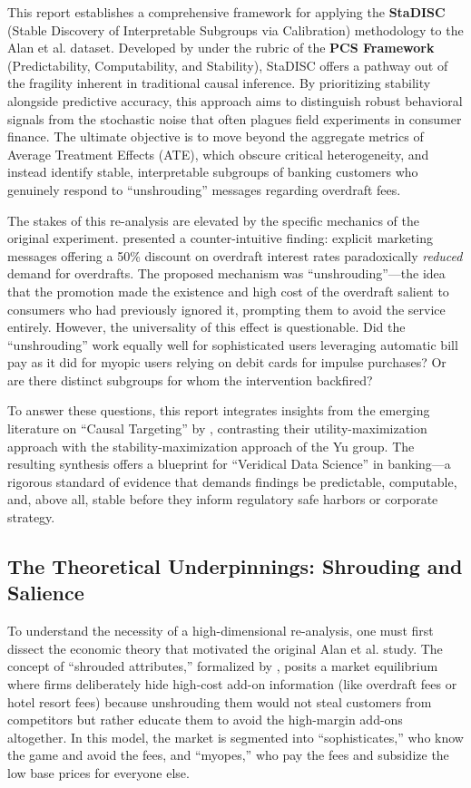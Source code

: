 \documentclass[11pt,a4paper]{article}
\begin{document}
	This report establishes a comprehensive framework for applying the \textbf{StaDISC} (Stable Discovery of Interpretable Subgroups via Calibration) methodology to the Alan et al. dataset. Developed by \citet{dwivedi2020} under the rubric of the \textbf{PCS Framework} (Predictability, Computability, and Stability), StaDISC offers a pathway out of the fragility inherent in traditional causal inference. By prioritizing stability alongside predictive accuracy, this approach aims to distinguish robust behavioral signals from the stochastic noise that often plagues field experiments in consumer finance. The ultimate objective is to move beyond the aggregate metrics of Average Treatment Effects (ATE), which obscure critical heterogeneity, and instead identify stable, interpretable subgroups of banking customers who genuinely respond to ``unshrouding'' messages regarding overdraft fees.
	
	The stakes of this re-analysis are elevated by the specific mechanics of the original experiment. \citet{alan2018} presented a counter-intuitive finding: explicit marketing messages offering a 50\% discount on overdraft interest rates paradoxically \emph{reduced} demand for overdrafts. The proposed mechanism was ``unshrouding''---the idea that the promotion made the existence and high cost of the overdraft salient to consumers who had previously ignored it, prompting them to avoid the service entirely. However, the universality of this effect is questionable. Did the ``unshrouding'' work equally well for sophisticated users leveraging automatic bill pay as it did for myopic users relying on debit cards for impulse purchases? Or are there distinct subgroups for whom the intervention backfired?
	
	To answer these questions, this report integrates insights from the emerging literature on ``Causal Targeting'' by \citet{athey2023}, contrasting their utility-maximization approach with the stability-maximization approach of the Yu group. The resulting synthesis offers a blueprint for ``Veridical Data Science'' in banking—a rigorous standard of evidence that demands findings be predictable, computable, and, above all, stable before they inform regulatory safe harbors or corporate strategy.
	
	\subsection{The Theoretical Underpinnings: Shrouding and Salience}
	To understand the necessity of a high-dimensional re-analysis, one must first dissect the economic theory that motivated the original Alan et al. study. The concept of ``shrouded attributes,'' formalized by \citet{gabaix2006}, posits a market equilibrium where firms deliberately hide high-cost add-on information (like overdraft fees or hotel resort fees) because unshrouding them would not steal customers from competitors but rather educate them to avoid the high-margin add-ons altogether. In this model, the market is segmented into ``sophisticates,'' who know the game and avoid the fees, and ``myopes,'' who pay the fees and subsidize the low base prices for everyone else.
	
\end{document}
